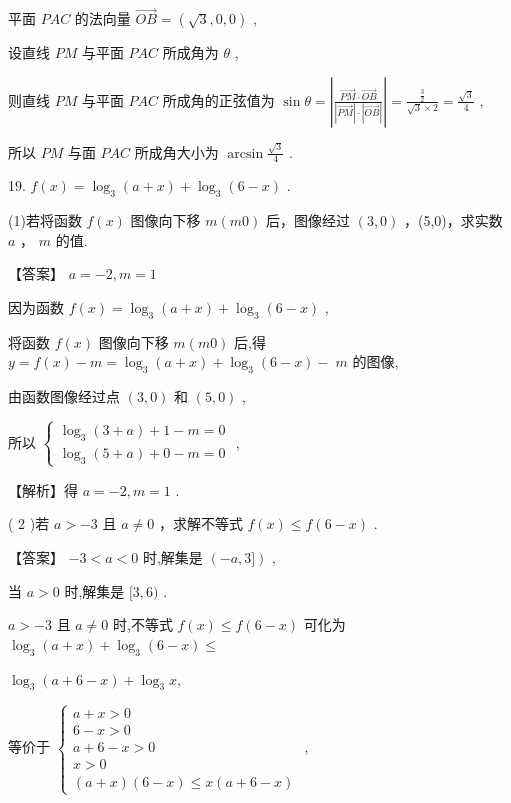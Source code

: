 \documentclass[10pt]{article}
\begin{document}
平面 \({PAC}\) 的法向量 \(\overrightarrow{OB} = \left( {\sqrt{3},0,0}\right)\) ,

设直线 \({PM}\) 与平面 \({PAC}\) 所成角为 \(\theta\) ,

则直线 \({PM}\) 与平面 \({PAC}\) 所成角的正弦值为 \(\sin \theta  = \left| \frac{\overrightarrow{PM} \cdot  \overrightarrow{OB}}{\left| \overrightarrow{PM}\right|  \cdot  \left| \overrightarrow{OB}\right| }\right|  = \frac{\frac{3}{2}}{\sqrt{3} \times  2} = \frac{\sqrt{3}}{4}\) ,

所以 \({PM}\) 与面 \({PAC}\) 所成角大小为 \(\arcsin \frac{\sqrt{3}}{4}\) .

19. \(f\left( x\right)  = {\log }_{3}\left( {a + x}\right)  + {\log }_{3}\left( {6 - x}\right)\) .

(1)若将函数 \(f\left( x\right)\) 图像向下移 \(m\left( {m0}\right)\) 后，图像经过 \(\left( {3,0}\right)\) ，(5,0)，求实数 \(a\) ， \(m\) 的值.

【答案】 \(a =  - 2,m = 1\)

因为函数 \(f\left( x\right)  = {\log }_{3}\left( {a + x}\right)  + {\log }_{3}\left( {6 - x}\right)\) ,

将函数 \(f\left( x\right)\) 图像向下移 \(m\left( {m0}\right)\) 后,得 \(y = f\left( x\right)  - m = {\log }_{3}\left( {a + x}\right)  + {\log }_{3}\left( {6 - x}\right)  - \; m\) 的图像,

由函数图像经过点 \(\left( {3,0}\right)\) 和 \(\left( {5,0}\right)\) ,

所以 \(\left\{  \begin{array}{l} {\log }_{3}\left( {3 + a}\right)  + 1 - m = 0 \\  {\log }_{3}\left( {5 + a}\right)  + 0 - m = 0 \end{array}\right.\) ,

【解析】得 \(a =  - 2,m = 1\) .

( 2 )若 \(a >  - 3\) 且 \(a \neq  0\) ，求解不等式 \(f\left( x\right)  \leq  f\left( {6 - x}\right)\) .

【答案】 \(- 3 < a < 0\) 时,解集是 \(\left( {-a,3\rbrack }\right)\) ,

当 \(a > 0\) 时,解集是 \(\lbrack 3,6)\) .

\(a >  - 3\) 且 \(a \neq  0\) 时,不等式 \(f\left( x\right)  \leq  f\left( {6 - x}\right)\) 可化为 \({\log }_{3}\left( {a + x}\right)  + {\log }_{3}\left( {6 - x}\right)  \leq\)

\({\log }_{3}\left( {a + 6 - x}\right)  + {\log }_{3}x,\)

等价于 \(\left\{  \begin{array}{l} a + x > 0 \\  6 - x > 0 \\  a + 6 - x > 0 \\  x > 0 \\  \left( {a + x}\right) \left( {6 - x}\right)  \leq  x\left( {a + 6 - x}\right)  \end{array}\right.\) ,
\end{document}
